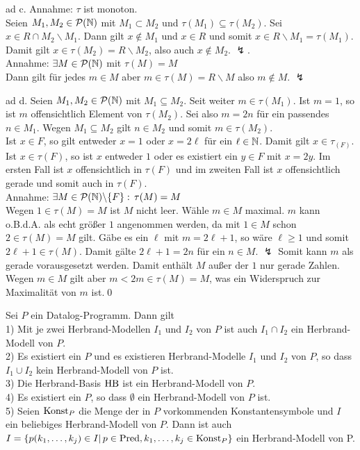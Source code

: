 \documentclass[12pt,a4paper]{amsart}
\begin{document}
\medskip

ad c. Annahme: $\tau$ ist monoton.\\
Seien $M_1,M_2\in\mathcal{P}(\mathbb{N})$ mit $M_1\subset M_2$ und $\tau(M_1)\subseteq \tau(M_2)$. Sei $x\in R\cap M_2\backslash M_1$. Dann gilt $x\not\in M_1$ und $x\in R$
und somit $x\in R\backslash M_1=\tau(M_1)$. Damit gilt $x\in \tau(M_2)=R\backslash M_2$, also auch $x\not\in M_2$. $\lightning$.\\
Annahme: $\exists M\in\mathcal{P}(\mathbb{N})$ mit $\tau(M)=M$\\
Dann gilt für jedes $m\in M$ aber $m\in\tau(M)=R\backslash M$ also $m\not\in M$. $\lightning$

ad d. Seien $M_1,M_2\in\mathcal{P}(\mathbb{N})$ mit $M_1\subseteq M_2$. Seit weiter $m\in\tau(M_1)$. Ist $m=1$, so ist $m$ offensichtlich Element von $\tau(M_2)$. Sei also
$m=2n$ für ein passendes $n\in M_1$. Wegen $M_1\subseteq M_2$ gilt $n\in M_2$ und somit $m\in\tau(M_2)$.\\
Ist $x\in F$, so gilt entweder $x=1$ oder $x=2\ell$ für ein $\ell\in\mathbb{N}$. Damit gilt $x\in \tau_(F)$. Ist $x\in\tau(F)$, so ist $x$ entweder $1$ oder es existiert ein
$y\in F$ mit $x=2y$. Im ersten Fall ist $x$ offensichtlich in $\tau(F)$ und im zweiten Fall ist $x$ offensichtlich gerade und somit auch in $\tau(F)$.\\
Annahme: $\exists M\in\mathcal{P}(\mathbb{N})\backslash \{F\}:\,\tau(M)=M$\\
Wegen $1\in\tau(M)=M$ ist $M$ nicht leer. Wähle $m\in M$ maximal. $m$ kann o.B.d.A. als echt größer $1$ angenommen werden, da mit $1\in M$ schon $2\in\tau(M)=M$ gilt.
Gäbe es ein $\ell$ mit $m=2\ell+1$, so wäre $\ell\geq 1$ und somit $2\ell+1\in\tau(M)$. Damit gälte $2\ell+1=2n$ für ein $n\in M$. $\lightning$ Somit kann $m$ als gerade
vorausgesetzt werden. Damit enthält $M$ außer der $1$ nur gerade Zahlen. Wegen $m\in M$ gilt aber $m<2m\in\tau(M)=M$, was ein Widerspruch zur Maximalität von $m$ ist.\qed

\begin{aufgabe1}
Sei $P$ ein Datalog-Programm. Dann gilt\\
1) Mit je zwei Herbrand-Modellen $I_1$ und $I_2$ von $P$ ist auch $I_1\cap I_2$ ein Herbrand-Modell von $P$.\\
2) Es existiert ein $P$ und es existieren Herbrand-Modelle $I_1$ und $I_2$ von $P$, so dass $I_1\cup I_2$ kein Herbrand-Modell von $P$ ist.\\
3) Die Herbrand-Basis $\operatorname{HB}$ ist ein Herbrand-Modell von $P$.\\
4) Es existiert ein $P$, so dass $\emptyset$ ein Herbrand-Modell von $P$ ist.\\
5) Seien $\operatorname{Konst}_P$ die Menge der in $P$ vorkommenden Konstantensymbole und $I$ ein beliebiges Herbrand-Modell von $P$. Dann ist auch $I= \{p(k_1,\dots, k_j) \in I |\, p\in\operatorname{Pred}, k_1,\dots, k_j \in \operatorname{Konst}_P \}$ ein Herbrand-Modell von P.
\end{aufgabe1}
\end{document}
